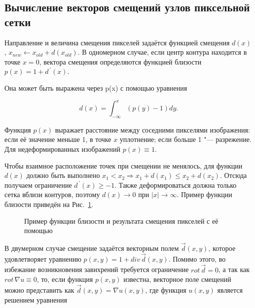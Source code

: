 %

\subsection{Вычисление векторов смещений узлов пиксельной сетки}

Направление и величина смещения пикселей задаётся функцией смещения $d\left(x\right)$, $x_{new} \leftarrow x_{old}+d(x_{old})$. В одномерном случае, если центр контура находится в точке $x = 0$, вектора смещения определяются функцией близости $p\left(x\right)=1+d^{\,\prime}(x)$.

Она может быть выражена через p(x) с помощью уравнения

\begin{equation*}
	d\left(x\right)=\int_{-\infty}^{x}\left(p\left(y\right)-1\right)dy.
\end{equation*}

Функция $p(x)$ выражает расстояние между соседними пикселями изображения: если её значение меньше 1, в точке $x$ уплотнение; если больше 1 "--- разрежение. Для недеформированных изображений $p(x)\equiv1$.

Чтобы взаимное расположение точек при смещении не менялось, для функции $d(x)$ должно быть выполнено $x_1<x_2 \Rightarrow x_1+d(x_1)\le x_2+d(x_2)$. Отсюда получаем ограничение $d^{\,\prime}\left(x\right)\geq-1$. Также деформироваться должна только сетка вблизи контуров, поэтому $d\left(x\right)\rightarrow0$ при  $\left|x\right|\rightarrow\infty$. Пример функции близости приведён на Рис.~\ref{fig:warping-proximity}.

\begin{figure}[ht]
	\caption{Пример функции близости и результата смещения пикселей с её помощью}
	\label{fig:warping-proximity}
\end{figure}

В двумерном случае смещение задаётся векторным полем $\vec{d}(x,y)$, которое удовлетворяет уравнению $p\left(x,y\right)=1+div\,\vec{d}(x,y)$. Помимо этого, во избежание возникновения завихрений требуется ограничение $rot\, \vec{d}=0$, а так как $rot\, \nabla u \equiv 0$, то, если функция $p(x, y)$ известна, векторное поле смещений можно представить как $\vec{d}\left(x,y\right)=\nabla u\left(x,y\right)$, где функция $u\left(x,y\right)$ является решением уравнения

